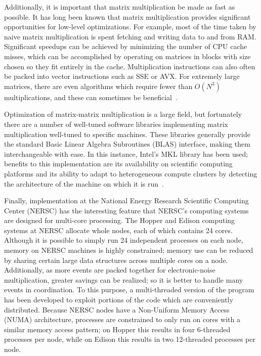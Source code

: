 Additionally, it is important that matrix multiplication be made as fast as possible.  It has long been known that matrix multiplication provides significant opportunities for low-level optimizations. For example, most of the time taken by naive matrix multiplication is spent fetching and writing data to and from RAM.  Significant speedups can be achieved by minimizing the number of CPU cache misses, which can be accomplished by operating on matrices in blocks with size chosen so they fit entirely in the cache.  Multiplication instructions can also often be packed into vector instructions such as SSE or AVX.  For extremely large matrices, there are even algorithms which require fewer than $O(N^3)$ multiplications, and these can sometimes be beneficial~\cite{AnatomyOfMatrixMultiply}.

Optimization of matrix-matrix multiplication is a large field, but fortunately there are a number of well-tuned software libraries implementing matrix multiplication well-tuned to specific machines.  These libraries generally provide the standard Basic Linear Algebra Subroutines (BLAS) interface, making them interchangeable with ease.  In this instance, Intel's MKL library has been used; benefits to this implementation are its availability on scientific computing platforms and its ability to adapt to heterogeneous compute clusters by detecting the architecture of the machine on which it is run~\cite{IntelMKL}.

Finally, implementation at the National Energy Research Scientific Computing Center (NERSC) has the interesting feature that NERSC's computing systems are designed for multi-core processing.  The Hopper and Edison computing systems at NERSC allocate whole nodes, each of which contains 24 cores.  Although it is possible to simply run 24 independent processes on each node, memory on NERSC machines is highly constrained; memory use can be reduced by sharing certain large data structures across multiple cores on a node.  Additionally, as more events are packed together for electronic-noise multiplication, greater savings can be realized; so it is better to handle many events in coordination.  To this purpose, a multi-threaded version of the program has been developed to exploit portions of the code which are conveniently distributed.  Because NERSC nodes have a Non-Uniform Memory Access (NUMA) architecture, processes are constrained to only run on cores with a similar memory access pattern; on Hopper this results in four 6-threaded processes per node, while on Edison this results in two 12-threaded processes per node.

